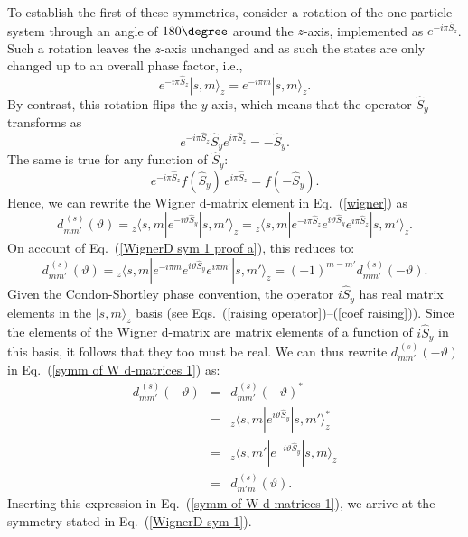 To establish the first of these symmetries, consider a rotation of the one-particle system through an angle of $180\degree$ around the $z$-axis, implemented as $e^{-i \pi \hat{S}_z}$. Such a rotation leaves the $z$-axis unchanged and as such the states are only changed up to an overall phase factor, i.e.,
\begin{equation}
    e^{-i\pi \hat{S}_z}| s, m \rangle_{z} = e^{-i \pi m}| s, m \rangle_{z}. 
    \label{WignerD sym 1 proof a}
\end{equation}
By contrast, this rotation flips the $y$-axis, which means that the operator $\hat{S}_y$ transforms as
\begin{equation}
    e^{-i\pi \hat{S}_z} \hat{S}_y e^{i\pi \hat{S}_z} = -\hat{S}_y.
\end{equation}
The same is true for any function of $\hat{S}_y$:
\begin{equation}
 e^{-i\pi \hat{S}_z} f(\hat{S}_y) \, e^{i\pi \hat{S}_z} = f(-\hat{S}_y).
\end{equation}
Hence, we can rewrite the Wigner d-matrix element in Eq.\ (\ref{wigner}) as
\begin{equation}
 d^{\,(s)}_{mm'}(\vartheta) = {_{z\!}}\langle s, m |e^{-i \vartheta \hat{S}_{y}}| s, m' \rangle_{z} = {_{z\!}}\langle s, m |e^{-i\pi \hat{S}_z}e^{i \vartheta \hat{S}_{y}}e^{i\pi \hat{S}_z}| s, m' \rangle_{z}.
\end{equation}
On account of Eq.\ (\ref{WignerD sym 1 proof a}), this reduces to: 
\begin{equation}
 d^{\,(s)}_{mm'}(\vartheta) = {_{z\!}}\langle s, m |e^{-i\pi m}e^{i \vartheta \hat{S}_{y}}e^{i\pi m'}| s, m' \rangle_{z} = (-1)^{m-m'} d^{\,(s)}_{mm'}(-\vartheta).
  \label{symm of W d-matrices 1}
\end{equation}
Given the Condon-Shortley phase convention, the operator $i\hat{S}_y$ has real matrix elements in the $|s,m\rangle_{\!z}$ basis (see Eqs.\ (\ref{raising operator})--(\ref{coef raising})). Since the elements of the Wigner d-matrix are matrix elements of a function of $i\hat{S}_y$  in this basis, it follows that they too must be real.
We can thus rewrite $d^{\,(s)}_{mm'}(-\vartheta)$ in Eq.\ (\ref{symm of W d-matrices 1}) as:
\begin{eqnarray}
    d^{\,(s)}_{mm'}(-\vartheta) 
    &\!\!=\!\!& d^{\,(s)}_{mm'}(-\vartheta) ^* \nonumber\\[.3 cm]
    &\!\!=\!\!& {_{z\!}}\langle s, m |e^{i \vartheta \hat{S}_{y}}| s, m' \rangle_{z}^* \nonumber\\[.3 cm]
    &\!\!=\!\!& {_{z\!}}\langle s, m' |e^{-i \vartheta \hat{S}_{y}}| s, m \rangle_{z} \nonumber \\[.3 cm]
    &\!\!=\!\!& d^{\,(s)}_{m'm}(\vartheta).
    \label{symm of W d-matrices 2}
\end{eqnarray}
Inserting this expression in Eq.\ (\ref{symm of W d-matrices 1}), we arrive at the symmetry stated in Eq.\ (\ref{WignerD sym 1}). 

